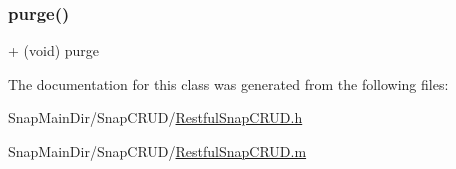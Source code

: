 \hypertarget{interface_restful_snap_c_r_u_d_a30e86726956cc8aac83bb1e648b9702e}{}\label{interface_restful_snap_c_r_u_d_a30e86726956cc8aac83bb1e648b9702e} 
\subsubsection{\texorpdfstring{purge()}{purge()}}
{\footnotesize\ttfamily + (void) purge \begin{DoxyParamCaption}{ }\end{DoxyParamCaption}}



The documentation for this class was generated from the following files\+:\begin{DoxyCompactItemize}
\item 
Snap\+Main\+Dir/\+Snap\+C\+R\+U\+D/\hyperlink{_restful_snap_c_r_u_d_8h}{Restful\+Snap\+C\+R\+U\+D.\+h}\item 
Snap\+Main\+Dir/\+Snap\+C\+R\+U\+D/\hyperlink{_restful_snap_c_r_u_d_8m}{Restful\+Snap\+C\+R\+U\+D.\+m}\end{DoxyCompactItemize}
